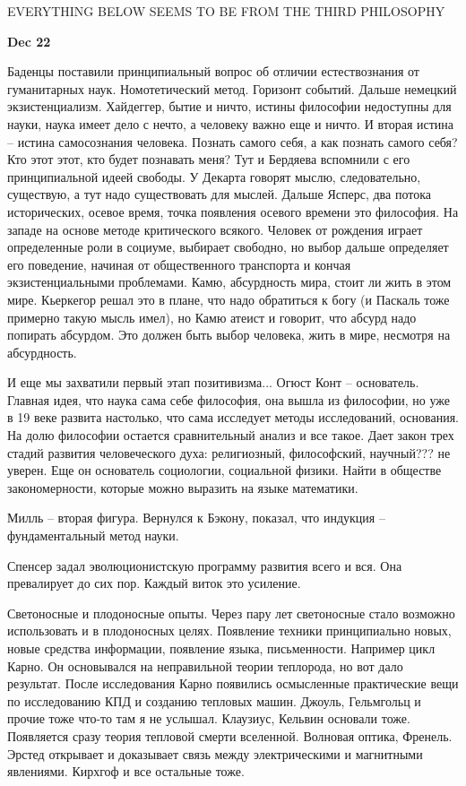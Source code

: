 \documentclass[a4paper, 12pt]{article}
\begin{document}
EVERYTHING BELOW SEEMS TO BE FROM THE THIRD PHILOSOPHY

\hfill \textbf{Dec 22}

Баденцы поставили принципиальный вопрос об отличии естествознания от 
гуманитарных наук. Номотетический метод. Горизонт событий.
Дальше немецкий экзистенциализм. Хайдеггер, бытие и ничто, истины 
философии недоступны для науки, наука имеет дело с нечто, а человеку 
важно еще и ничто. И вторая истина -- истина самосознания человека. 
Познать самого себя, а как познать самого себя? Кто этот этот, кто будет 
познавать меня? Тут и Бердяева вспомнили с его принципиальной идеей 
свободы. У Декарта говорят мыслю, следовательно, существую, а тут надо 
существовать для мыслей.
Дальше Ясперс, два потока исторических, осевое время, точка появления 
осевого времени это философия. На западе на основе методе критического 
всякого. Человек от рождения играет определенные роли в социуме, 
выбирает свободно, но выбор дальше определяет его поведение, начиная от 
общественного транспорта и кончая экзистенциальными проблемами.
Камю, абсурдность мира, стоит ли жить в этом мире. Кьеркегор решал это 
в плане, что надо обратиться к богу (и Паскаль тоже примерно такую мысль 
имел), но Камю атеист и говорит, что абсурд надо попирать абсурдом. Это 
должен быть выбор человека, жить в мире, несмотря на абсурдность.

И еще мы захватили первый этап позитивизма... Огюст Конт -- основатель. 
Главная идея, что наука сама себе философия, она вышла из философии, но 
уже в 19 веке развита настолько, что сама исследует методы исследований, 
основания. На долю философии остается сравнительный анализ и все такое. 
Дает закон трех стадий развития человеческого духа: религиозный, 
философский, научный??? не уверен. Еще он основатель социологии, 
социальной физики. Найти в обществе закономерности, которые можно 
выразить на языке математики.

Милль -- вторая фигура. Вернулся к Бэкону, показал, что индукция -- 
фундаментальный метод науки.

Спенсер задал эволюционистскую программу развития всего и вся. Она 
превалирует до сих пор. Каждый виток это усиление.

Светоносные и плодоносные опыты. Через пару лет светоносные стало 
возможно использовать и в плодоносных целях. Появление техники 
принципиально новых, новые средства информации, появление языка, 
письменности. Например цикл Карно. Он основывался на неправильной теории 
теплорода, но вот дало результат. После исследования Карно появились 
осмысленные практические вещи по исследованию КПД и созданию тепловых 
машин. Джоуль, Гельмгольц и прочие тоже что-то там я не услышал. 
Клаузиус, Кельвин основали тоже. Появляется сразу теория тепловой смерти 
вселенной. Волновая оптика, Френель. Эрстед открывает и доказывает связь 
между электрическими и магнитными явлениями. Кирхгоф и все остальные 
тоже.
\end{document}

